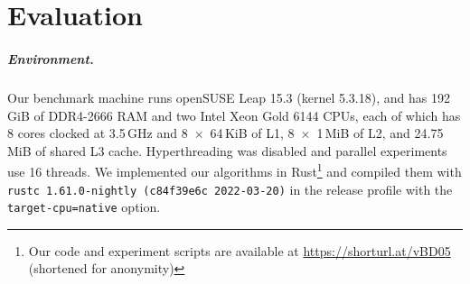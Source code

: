 \documentclass[a4paper,UKenglish,cleveref, autoref, thm-restate,anonymous]{lipics-v2021}
\begin{document}
\section{Evaluation}
\subparagraph{Environment.} Our benchmark machine runs openSUSE Leap 15.3 (kernel 5.3.18), and has 192\,GiB of DDR4-2666 RAM and two Intel Xeon Gold 6144 CPUs, each of which has 8 cores clocked at 3.5\,GHz and 8~$\times$~64\,KiB of L1, 8~$\times$~1\,MiB of L2, and 24.75\,MiB of shared L3 cache.
Hyperthreading was disabled and parallel experiments use 16 threads.
We implemented our algorithms in Rust\footnote{
Our code and experiment scripts are available at \url{https://shorturl.at/vBD05} (shortened for anonymity)
} and compiled them with \texttt{rustc 1.61.0-nightly (c84f39e6c 2022-03-20)} in the release profile with the \texttt{target-cpu=native} option.
\end{document}
